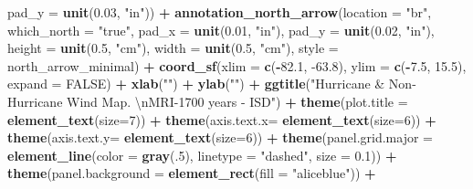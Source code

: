\documentclass[12pt,oneside]{reedthesis}
\newenvironment{Shaded}{\begin{snugshade}}{\end{snugshade}}
\newcommand{\CharTok}[1]{\textcolor[rgb]{0.31,0.60,0.02}{#1}}
\newcommand{\DataTypeTok}[1]{\textcolor[rgb]{0.13,0.29,0.53}{#1}}
\newcommand{\DecValTok}[1]{\textcolor[rgb]{0.00,0.00,0.81}{#1}}
\newcommand{\FloatTok}[1]{\textcolor[rgb]{0.00,0.00,0.81}{#1}}
\newcommand{\KeywordTok}[1]{\textcolor[rgb]{0.13,0.29,0.53}{\textbf{#1}}}
\newcommand{\NormalTok}[1]{#1}
\newcommand{\OperatorTok}[1]{\textcolor[rgb]{0.81,0.36,0.00}{\textbf{#1}}}
\newcommand{\OtherTok}[1]{\textcolor[rgb]{0.56,0.35,0.01}{#1}}
\newcommand{\StringTok}[1]{\textcolor[rgb]{0.31,0.60,0.02}{#1}}
\begin{document}
\begin{Shaded}
\begin{Highlighting}[]
   \DataTypeTok{pad_y =} \KeywordTok{unit}\NormalTok{(}\FloatTok{0.03}\NormalTok{, }\StringTok{"in"}\NormalTok{)) }\OperatorTok{+}\StringTok{ }
\StringTok{  }\KeywordTok{annotation_north_arrow}\NormalTok{(}\DataTypeTok{location =} \StringTok{"br"}\NormalTok{, }\DataTypeTok{which_north =} \StringTok{"true"}\NormalTok{, }\DataTypeTok{pad_x =} \KeywordTok{unit}\NormalTok{(}\FloatTok{0.01}\NormalTok{, }\StringTok{"in"}\NormalTok{), }\DataTypeTok{pad_y =} \KeywordTok{unit}\NormalTok{(}\FloatTok{0.02}\NormalTok{, }\StringTok{"in"}\NormalTok{), }\DataTypeTok{height =} \KeywordTok{unit}\NormalTok{(}\FloatTok{0.5}\NormalTok{, }\StringTok{"cm"}\NormalTok{), }
   \DataTypeTok{width =} \KeywordTok{unit}\NormalTok{(}\FloatTok{0.5}\NormalTok{, }\StringTok{"cm"}\NormalTok{), }\DataTypeTok{style =}\NormalTok{ north_arrow_minimal) }\OperatorTok{+}
\StringTok{  }\KeywordTok{coord_sf}\NormalTok{(}\DataTypeTok{xlim =} \KeywordTok{c}\NormalTok{(}\OperatorTok{-}\FloatTok{82.1}\NormalTok{, }\FloatTok{-63.8}\NormalTok{), }\DataTypeTok{ylim =} \KeywordTok{c}\NormalTok{(}\OperatorTok{-}\FloatTok{7.5}\NormalTok{, }\FloatTok{15.5}\NormalTok{), }\DataTypeTok{expand =} \OtherTok{FALSE}\NormalTok{) }\OperatorTok{+}
\StringTok{  }\KeywordTok{xlab}\NormalTok{(}\StringTok{""}\NormalTok{) }\OperatorTok{+}\StringTok{ }
\StringTok{  }\KeywordTok{ylab}\NormalTok{(}\StringTok{""}\NormalTok{) }\OperatorTok{+}\StringTok{ }
\StringTok{  }\KeywordTok{ggtitle}\NormalTok{(}\StringTok{"Hurricane & Non-Hurricane Wind Map. }\CharTok{\textbackslash{}n}\StringTok{MRI-1700 years - ISD"}\NormalTok{) }\OperatorTok{+}\StringTok{ }
\StringTok{  }\KeywordTok{theme}\NormalTok{(}\DataTypeTok{plot.title =} \KeywordTok{element_text}\NormalTok{(}\DataTypeTok{size=}\DecValTok{7}\NormalTok{)) }\OperatorTok{+}
\StringTok{  }\KeywordTok{theme}\NormalTok{(}\DataTypeTok{axis.text.x=} \KeywordTok{element_text}\NormalTok{(}\DataTypeTok{size=}\DecValTok{6}\NormalTok{)) }\OperatorTok{+}\StringTok{ }
\StringTok{  }\KeywordTok{theme}\NormalTok{(}\DataTypeTok{axis.text.y=} \KeywordTok{element_text}\NormalTok{(}\DataTypeTok{size=}\DecValTok{6}\NormalTok{)) }\OperatorTok{+}
\StringTok{  }\KeywordTok{theme}\NormalTok{(}\DataTypeTok{panel.grid.major =} \KeywordTok{element_line}\NormalTok{(}\DataTypeTok{color =} \KeywordTok{gray}\NormalTok{(.}\DecValTok{5}\NormalTok{), }\DataTypeTok{linetype =} \StringTok{"dashed"}\NormalTok{, }\DataTypeTok{size =} \FloatTok{0.1}\NormalTok{)) }\OperatorTok{+}
\StringTok{  }\KeywordTok{theme}\NormalTok{(}\DataTypeTok{panel.background =} \KeywordTok{element_rect}\NormalTok{(}\DataTypeTok{fill =} \StringTok{"aliceblue"}\NormalTok{)) }\OperatorTok{+}

\end{Highlighting}
\end{Shaded}
\end{document}

